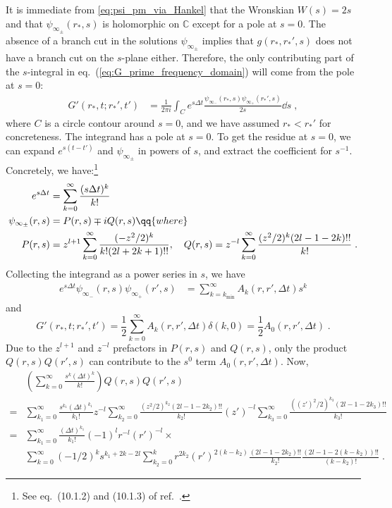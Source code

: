 It is immediate from \eqref{eq:psi_pm_via_Hankel}  that the Wronskian $W(s)=2s$ and that $\psi_{\infty_\pm}(r_*, s)$ is holomorphic on $\mathbb{C}$ except for a pole at $s=0$.
The absence of a branch cut in the solutions \(\psi_{\infty_\pm}\) implies that 
\(g(r_*,r_*',s)\) does not have a branch cut on the $s$-plane either.
Therefore, the only contributing part of the $s$-integral in eq.~(\ref{eq:G_prime_frequency_domain}) will come from the pole at $s=0$:
\begin{align}
  \label{eq:G_prime_contour_integral}
  G'(r_*, t; r_*', t')  &= \frac{1}{2 \pi i} \int_{C} e^{s \Delta{t}} \frac{\psi_{\infty_-}(r_*, s) \psi_{\infty_+}(r_*', s)}{2s} \dd{s} \;,
\end{align}
where $C$ is a circle contour around $s=0$, and we have assumed $r_* < r_*'$ for concreteness. The integrand has a pole at $s=0$. 
To get the residue at $s=0$, we can expand $e^{s(t-t')}$ and $\psi_{\infty_\pm}$ in powers of $s$, and extract the coefficient for $s^{-1}$.
Concretely, we have:\footnote{See eq.~(10.1.2) and (10.1.3) of ref.~\cite{abramowitz+stegun}.}
\begin{align}
    e^{s \Delta{t}} &= \sum_{k=0}^\infty \frac{(s \Delta{t})^k}{k!} \nonumber \\
  \psi_{\infty_\pm}(r, s) &= P(r, s) \mp i Q(r, s) \qq{where} \nonumber \\
   P(r, s) &= z^{l+1} \sum_{k=0}^\infty \frac{(-z^2/2)^k }{k! (2l+2k+1)!!},\quad Q(r, s) = z^{-l} \sum_{k=0}^{\infty} \frac{(z^2/2)^k  (2l-1-2k)!! }{k!} \;.
\end{align}
Collecting the integrand as a power series in $s$, we have
\begin{align}
  e^{s\Delta{t}} \psi_{\infty_-}(r, s) \psi_{\infty_+}(r', s) &= \sum_{k=k_{\mathrm{min}}}^\infty A_k(r, r', \Delta{t}) s^k
\end{align}
and
\begin{equation}
     G'(r_*, t; r_*', t') = \frac{1}{2}\sum_{k=0}^{\infty} A_k(r, r', \Delta{t}) \delta(k, 0)=\frac{1}{2}A_0(r, r', \Delta{t}) \;.
\end{equation}
Due to the $z^{l+1}$ and $z^{-l}$ prefactors in \( P(r, s) \) and \( Q(r, s) \), only the product \( Q(r, s) Q(r', s) \) can contribute to the $s^0$ term \( A_0(r, r', \Delta{t}) \).
Now,
\begin{align}
  &\left(\sum_{k=0}^\infty \frac{s^k(\Delta{t})^k}{k!}\right) Q(r,s)Q(r',s) \nonumber \\
  =& \sum_{k_1=0}^\infty \frac{s^{k_1}(\Delta{t})^{k_1}}{k_1!}
     z^{-l} \sum_{k_2=0}^{\infty} \frac{(z^2/2)^{k_2}  (2l-1-2k_2)!! }{k_2!}
     (z')^{-l} \sum_{k_3=0}^{\infty} \frac{((z')^2/2)^{k_3}  (2l-1-2k_3)!! }{k_3!} \nonumber \\
  =& \sum_{k_1=0}^\infty \frac{(\Delta{t})^{k_1}}{k_1!} (-1)^{l} r^{-l} (r')^{-l} \times \nonumber \\
  & \sum_{k=0}^\infty (-1/2)^k s^{k_1 + 2 k - 2 l} \sum_{k_2=0}^k r^{2k_2} (r')^{2(k-k_2)} \frac{ (2l-1-2k_2)!! }{k_2!} \frac{ (2l-1-2(k-k_2))!! }{(k-k_2)!} \;.
\end{align}
